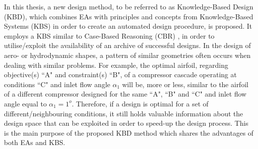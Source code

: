 In this thesis, a new design method, to be referred to as  Knowledge-Based Design (KBD), which combines EAs with principles and concepts from Knowledge-Based Systems (KBS) in order to create an automated design procedure, is proposed. It employs a KBS similar to Case-Based Reasoning (CBR) \cite{kolodner_1991,kolodner_1993,slade_1991,riesbeck_1989}, in order to utilise/exploit the availability of an archive of successful designs. In the design of aero- or hydrodynamic shapes, a pattern of similar geometries often occurs when dealing with similar problems. For example, the optimal airfoil, regarding objective(s) ``A" and constraint(s) ``B", of a compressor cascade operating at conditions ``C" and inlet flow angle $\alpha_1$ will be, more or less, similar to the airfoil of a different compressor designed for the same ``A", ``B" and ``C" and inlet flow angle equal to $\alpha_1\!=\!1^o$.  Therefore, if a design is optimal for a set of different/neighbouring conditions, it still holds valuable information about the design space that can be exploited in order to speed-up the design process. This is the main purpose of the proposed KBD method which shares the advantages of both EAs and KBS.    

